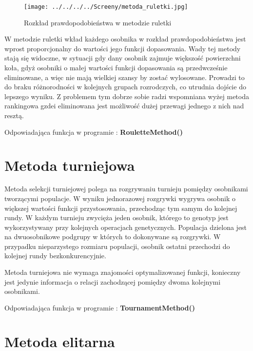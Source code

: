\begin{figure}[h]
		\texttt{[image: ../../../../Screeny/metoda\_ruletki.jpg]}
		\caption{Rozkład prawdopodobieństwa w metodzie ruletki}
		\label{ruletka}			
\end{figure}
\par
W metodzie ruletki wkład każdego osobnika w rozkład prawdopodobieństwa jest wprost proporcjonalny do wartości jego funkcji dopasowania. Wady tej metody stają się widoczne, w sytuacji gdy dany osobnik zajmuje większość powierzchni koła, gdyż osobniki o małej wartości funkcji dopasowania są przedwcześnie eliminowane, a więc nie mają wielkiej szansy by zostać wylosowane. Prowadzi to do braku różnorodności w kolejnych grupach rozrodczych, co utrudnia dojście do lepszego wyniku. Z problemem tym dobrze sobie radzi wspomniana wyżej metoda rankingowa gzdei eliminowana jest możliwość dużej przewagi jednego z nich nad resztą.\\
\par
Odpowiadająca funkcja w programie : \textbf{RouletteMethod()}


\section{Metoda turniejowa}\label{sec:narzedzia}


Metoda selekcji turniejowej polega na rozgrywaniu turnieju pomiędzy osobnikami tworzącymi populacje. W wyniku jednorazowej rozgrywki wygrywa osobnik o większej wartości funkcji przystosowania, przechodząc tym samym do kolejnej rundy. W każdym turnieju zwycięża jeden osobnik, którego to genotyp jest wykorzystywany przy kolejnych operacjach genetycznych. Populacja dzielona jest na dwuosobnikowe podgrupy w których to dokonywane są rozgrywki. W przypadku nieparzystego rozmiaru populacji, osobnik ostatni przechodzi do kolejnej rundy bezkonkurencyjnie. \\
\par
Metoda turniejowa nie wymaga znajomości optymalizowanej funkcji, konieczny jest jedynie informacja o relacji zachodzącej pomiędzy dwoma kolejnymi osobnikami. 
\par
Odpowiadająca funkcja w programie : \textbf{TournamentMethod()}


\section{Metoda elitarna}\label{sec:przygotowanieDokumentu}

